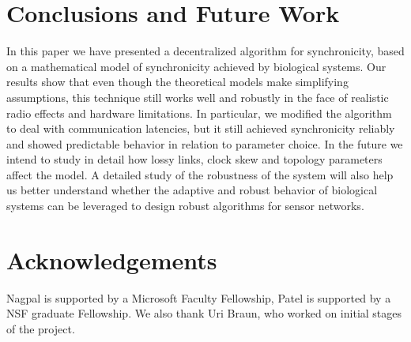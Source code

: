 
\section{Conclusions and Future Work}

In this paper we have presented a decentralized algorithm for
synchronicity, based on a mathematical model of synchronicity achieved
by biological systems. Our results show that even though the
theoretical models make simplifying assumptions, this technique still
works well and robustly in the face of realistic radio effects and
hardware limitations. In particular, we modified the algorithm to deal
with communication latencies, but it still achieved synchronicity
reliably and showed predictable behavior in relation to parameter
choice. In the future we intend to study in detail how lossy links,
clock skew and topology parameters affect the model. A detailed study
of the robustness of the system will also help us better understand
whether the adaptive and robust behavior of biological systems can be
leveraged to design robust algorithms for sensor networks.

\section{Acknowledgements}

Nagpal is supported by a Microsoft Faculty Fellowship, Patel is
supported by a NSF graduate Fellowship. We also thank Uri Braun, who
worked on initial stages of the project.
